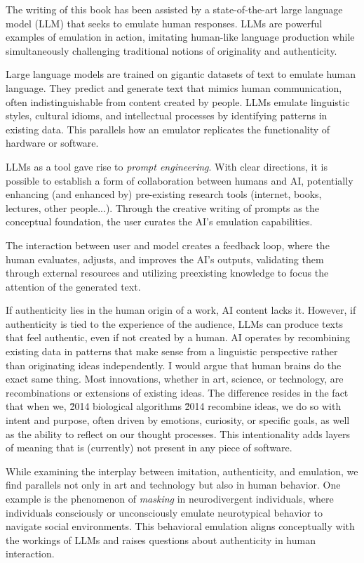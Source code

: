 The writing of this book has been assisted by a state-of-the-art large language model (LLM) that seeks to emulate human responses. LLMs are powerful examples of emulation in action, imitating human-like language production while simultaneously challenging traditional notions of originality and authenticity.

Large language models are trained on gigantic datasets of text to emulate human language. They predict and generate text that mimics human communication, often indistinguishable from content created by people. LLMs emulate linguistic styles, cultural idioms, and intellectual processes by identifying patterns in existing data. This parallels how an emulator replicates the functionality of hardware or software.

LLMs as a tool gave rise to \textit{prompt engineering}. With clear directions, it is possible to establish a form of collaboration between humans and AI, potentially enhancing (and enhanced by) pre-existing research tools (internet, books, lectures, other people...). Through the creative writing of prompts as the conceptual foundation, the user curates the AI's emulation capabilities.

The interaction between user and model creates a feedback loop, where the human evaluates, adjusts, and improves the AI's outputs, validating them through external resources and utilizing preexisting knowledge to focus the attention of the generated text.

If authenticity lies in the human origin of a work, AI content lacks it. However, if authenticity is tied to the experience of the audience, LLMs can produce texts that feel authentic, even if not created by a human. AI operates by recombining existing data in patterns that make sense from a linguistic perspective rather than originating ideas independently. I would argue that human brains do the exact same thing. Most innovations, whether in art, science, or technology, are recombinations or extensions of existing ideas. The difference resides in the fact that when we, \u2014 biological algorithms \u2014 recombine ideas, we do so with intent and purpose, often driven by emotions, curiosity, or specific goals, as well as the ability to reflect on our thought processes. This intentionality adds layers of meaning that is (currently) not present in any piece of software.

While examining the interplay between imitation, authenticity, and emulation, we find parallels not only in art and technology but also in human behavior. One example is the phenomenon of \textit{masking} in neurodivergent individuals, where individuals consciously or unconsciously emulate neurotypical behavior to navigate social environments. This behavioral emulation aligns conceptually with the workings of LLMs and raises questions about authenticity in human interaction.

